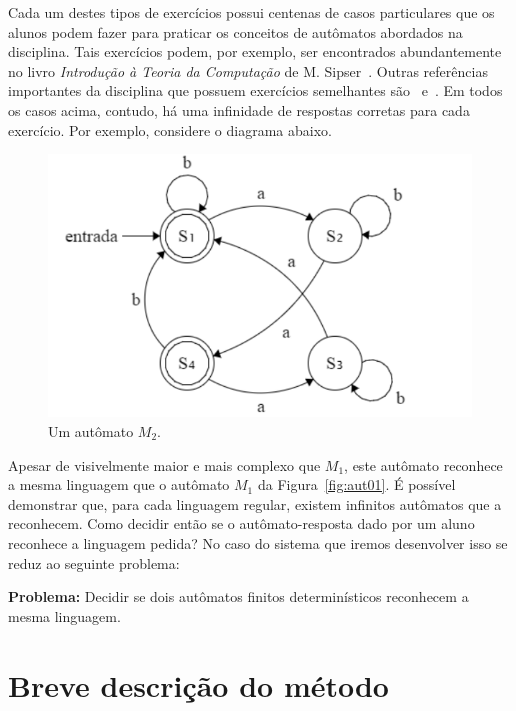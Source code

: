 \documentclass[
	12pt,				%
	openany,
	oneside,
	a4paper,			%
	english,			%
	brazil,				%
	]{abntex2}
\begin{document}
Cada um destes tipos de exercícios possui centenas de casos particulares que os alunos podem fazer para praticar os conceitos de autômatos abordados na disciplina. Tais exercícios podem, por exemplo, ser encontrados abundantemente no livro \textit{Introdução à Teoria da Computação} de M. Sipser~\cite{sipser}. Outras referências importantes da disciplina que possuem exercícios semelhantes são~\cite{ullman} e~\cite{linz}. Em todos os casos acima, contudo, há uma infinidade de respostas corretas para cada exercício. Por exemplo, considere o diagrama abaixo.

\begin{figure}[H]
	\vspace{-0.5cm}
	\centering
	\includegraphics[scale=.65]{aut02.png}
	\vspace{-0.2cm}
	\caption{Um autômato $M_2$.}
	\label{fig:aut02}
	\vspace{-0.5cm}
\end{figure}

Apesar de visivelmente maior e mais complexo que $M_1$, este autômato reconhece a mesma linguagem que o autômato $M_1$ da Figura~\ref{fig:aut01}. É possível demonstrar que, para cada linguagem regular, existem infinitos autômatos que a reconhecem. Como decidir então se o autômato-resposta dado por um aluno reconhece a linguagem pedida? No caso do sistema que iremos desenvolver isso se reduz ao seguinte problema:
\bigskip

{\large
\noindent \textbf{Problema:} Decidir se dois autômatos finitos determinísticos reconhecem a mesma linguagem.
}


\section {Breve descrição do método}
\end{document}
